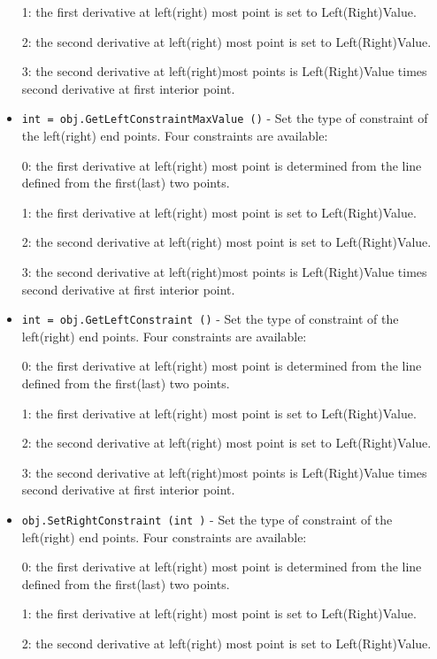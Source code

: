 \begin{itemize}
 1: the first derivative at left(right) most point is set to
 Left(Right)Value.
 
 2: the second derivative at left(right) most point is set to
 Left(Right)Value.
 
 3: the second derivative at left(right)most points is Left(Right)Value
 times second derivative at first interior point.

\item  \verb|int = obj.GetLeftConstraintMaxValue ()| -  Set the type of constraint of the left(right) end points. Four
 constraints are available:

 0: the first derivative at left(right) most point is determined
 from the line defined from the first(last) two points.

 1: the first derivative at left(right) most point is set to
 Left(Right)Value.
 
 2: the second derivative at left(right) most point is set to
 Left(Right)Value.
 
 3: the second derivative at left(right)most points is Left(Right)Value
 times second derivative at first interior point.

\item  \verb|int = obj.GetLeftConstraint ()| -  Set the type of constraint of the left(right) end points. Four
 constraints are available:

 0: the first derivative at left(right) most point is determined
 from the line defined from the first(last) two points.

 1: the first derivative at left(right) most point is set to
 Left(Right)Value.
 
 2: the second derivative at left(right) most point is set to
 Left(Right)Value.
 
 3: the second derivative at left(right)most points is Left(Right)Value
 times second derivative at first interior point.

\item  \verb|obj.SetRightConstraint (int )| -  Set the type of constraint of the left(right) end points. Four
 constraints are available:

 0: the first derivative at left(right) most point is determined
 from the line defined from the first(last) two points.

 1: the first derivative at left(right) most point is set to
 Left(Right)Value.
 
 2: the second derivative at left(right) most point is set to
 Left(Right)Value.
 

\end{itemize}

